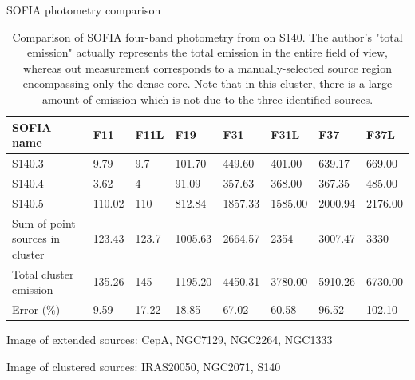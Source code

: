 \renewcommand{\arraystretch}{1.5}
\def\labelitemi{--}
\begin{table}[!h]
\scriptsize
\caption{SOFIA photometry comparison} \label{tab:SOFIAPhotometryHarvey}
\vspace{-0.5cm}
\begin{longtable}{l|P{1cm}P{1cm}P{1cm}P{1cm}P{1cm}P{1cm}P{1cm}}
\toprule																			

SOFIA name	&	F11	&	F11L	&	F19	&	F31	&	F31L	&	F37	&	F37L	\\
\midrule															
S140.3	&	9.79	&	9.7	&	101.70	&	449.60	&	401.00	&	639.17	&	669.00	\\
S140.4	&	3.62	&	4	&	91.09	&	357.63	&	368.00	&	367.35	&	485.00	\\
S140.5	&	110.02	&	110	&	812.84	&	1857.33	&	1585.00	&	2000.94	&	2176.00	\\
\midrule															
Sum of point sources in cluster	&	123.43	&	123.7	&	1005.63	&	2664.57	&	2354	&	3007.47	&	3330	\\
Total cluster emission	&	135.26	&	145	&	1195.20	&	4450.31	&	3780.00	&	5910.26	&	6730.00	\\
Error (\%)	&	9.59	&	17.22	&	18.85	&	67.02	&	60.58	&	96.52	&	102.10	\\
\bottomrule					
	\end{longtable} 
\caption*{Comparison of SOFIA four-band photometry from \citet{Harvey:2012kw} on S140. The author's "total emission" actually represents the total emission in the entire field of view, whereas out measurement corresponds to a manually-selected source region encompassing only the dense core. Note that in this cluster, there is a large amount of emission which is not due to the three identified sources.}

\end{table}

Image of extended sources: CepA, NGC7129, NGC2264, NGC1333

Image of clustered sources: IRAS20050, NGC2071, S140



